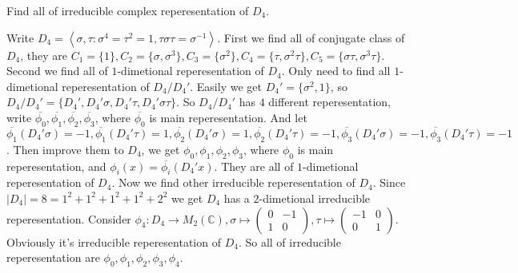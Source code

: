 \documentclass{ctexart}
\newif\ifpreface
\begin{document}
\large
\setlength{\baselineskip}{1.2em}
\ifpreface
    
\newgeometry{left=2cm,right=2cm,top=2cm,bottom=2cm}
\else
{}
\maketitle
\fi
\begin{problem}
  Find all of irreducible complex reperesentation of \(D_4\). 
\end{problem}
\begin{solution}
  Write \(D_4=\left\langle \sigma,\tau:\sigma^4=\tau^2=1,\tau \sigma \tau = \sigma^{-1}\right\rangle \). 
  First we find all of conjugate class of \(D_4\), they are \(C_1=\{1\},C_2=\{\sigma,\sigma^3\},C_3=\{\sigma^2\},C_4=\{\tau,\sigma^2 \tau\},C_5=\{\sigma \tau,\sigma^3 \tau\}\). 
  Second we find all of \(1\)-dimetional reperesentation of \(D_4\). Only need to find all \(1\)-dimetional reperesentation of \(D_4/D_4'\). 
  Easily we get \(D_4'=\{\sigma^2,1\}\), so \(D_4/D_4'=\{D_4',D_4'\sigma,D_4'\tau,D_4'\sigma \tau\}\). 
  So \(D_4/D_4'\) has \(4\) different reperesentation, write \(\overline{\phi_0},\overline{\phi_1},\overline{\phi_2},\overline{\phi_3}\), where \(\overline{\phi_0}\) is main reperesentation. 
  And let \(\overline{\phi_1}(D_4'\sigma)=-1,\overline{\phi_1}(D_4'\tau)=1,\overline{\phi_2}(D_4'\sigma)=1,\overline{\phi_2}(D_4'\tau)=-1,\overline{\phi_3}(D_4'\sigma)=-1,\overline{\phi_3}(D_4'\tau)=-1\). 
  Then improve them to \(D_4\), we get \(\phi_0,\phi_1,\phi_2,\phi_3\), where \(\phi_0\) is main reperesentation, and 
  \(\phi_i(x)=\overline{\phi_i}(D_4'x)\). They are all of \(1\)-dimetional reperesentation of \(D_4\). 
  Now we find other irreducible reperesentation of \(D_4\). 
  Since \(|D_4|=8=1^2+1^2+1^2+1^2+2^2\) we get \(D_4\) has a \(2\)-dimetional irreducible reperesentation. 
  Consider \(\phi_4:D_4 \to M_2(\mathbb{C}),\sigma \mapsto \begin{pmatrix}
    0 & -1 \\
    1 & 0
  \end{pmatrix},\tau \mapsto \begin{pmatrix}
    -1 & 0 \\
    0 & 1 
  \end{pmatrix}\). 
  Obviously it's irreducible reperesentation of \(D_4\). 
  So all of irreducible reperesentation are \(\phi_0,\phi_1,\phi_2,\phi_3,\phi_4\). 
\end{solution}
\end{document}
